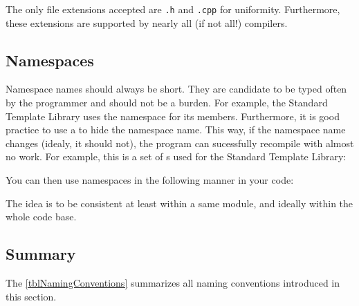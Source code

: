 \clearpage


The only file extensions accepted are \texttt{.h} and \texttt{.cpp} for 
uniformity. Furthermore, these extensions are supported by nearly all (if not 
all!) compilers.

\clearpage

\subsection{Namespaces}

Namespace names should always be short. They are candidate to be typed often by 
the programmer and should not be a burden. For example, the Standard Template 
Library uses the namespace  for its members. Furthermore, it is good 
practice to use a  to hide the namespace name. This way, if the 
namespace name changes (idealy, it should not), the program can sucessfully 
recompile with almost no work. For example, this is a set of s 
used for the Standard Template Library:

  
You can then use namespaces in the following manner in your code:


The idea is to be consistent at least within a same module, and ideally within 
the whole code base.

\subsection{Summary}

The \cref{tblNamingConventions} summarizes all naming conventions introduced in 
this section.

